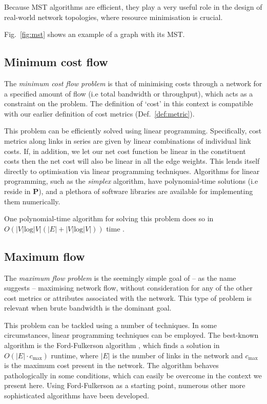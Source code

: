 \documentclass[aps, rmp, twocolumn, amsmath, amssymb, nofootinbib, superscriptaddress, longbibliography, floatfix, table-of-contents, eqsecnum]{revtex4-1}
\begin{document}
Because MST algorithms are efficient, they play a very useful role in the design of real-world network topologies, where resource minimisation is crucial.

Fig.~\ref{fig:mst} shows an example of a graph with its MST.

%
%

\subsection{Minimum cost flow} \label{sec:min_cost_flow_prob} 

The \textit{minimum cost flow problem} \cite{???} is that of minimising costs through a network for a specified amount of flow (i.e total bandwidth or throughput), which acts as a constraint on the problem. The definition of `cost' in this context is compatible with our earlier definition of cost metrics (Def.~\ref{def:metric}).

This problem can be efficiently solved using linear programming. Specifically, cost metrics along links in series are given by linear combinations of individual link costs. If, in addition, we let our net cost function be linear in the constituent costs then the net cost will also be linear in all the edge weights. This lends itself directly to optimisation via linear programming techniques. Algorithms for linear programming, such as the \textit{simplex} algorithm, have polynomial-time solutions (i.e reside in \textbf{P}), and a plethora of software libraries are available for implementing them numerically.

One polynomial-time algorithm for solving this problem does so in \mbox{$O(|V|\text{log}|V|(|E|+|V|\text{log}|V|))$} time \cite{JAMES_B_ORLIN}.

%
%

\subsection{Maximum flow} \label{sec:max_flow_prob} 

The \textit{maximum flow problem} \cite{???} is the seemingly simple goal of -- as the name suggests -- maximising network flow, without consideration for any of the other cost metrics or attributes associated with the network. This type of problem is relevant when brute bandwidth is the dominant goal.

This problem can be tackled using a number of techniques. In some circumstances, linear programming techniques can be employed. The best-known algorithm is the Ford-Fulkerson algorithm \cite{???}, which finds a solution in \mbox{$O(|E|\cdot c_\text{max})$} runtime, where $|E|$ is the number of links in the network and $c_\text{max}$ is the maximum cost present in the network. The algorithm behaves pathologically in some conditions, which can easily be overcome in the context we present here. Using Ford-Fulkerson as a starting point, numerous other more sophisticated algorithms have been developed.
\end{document}

